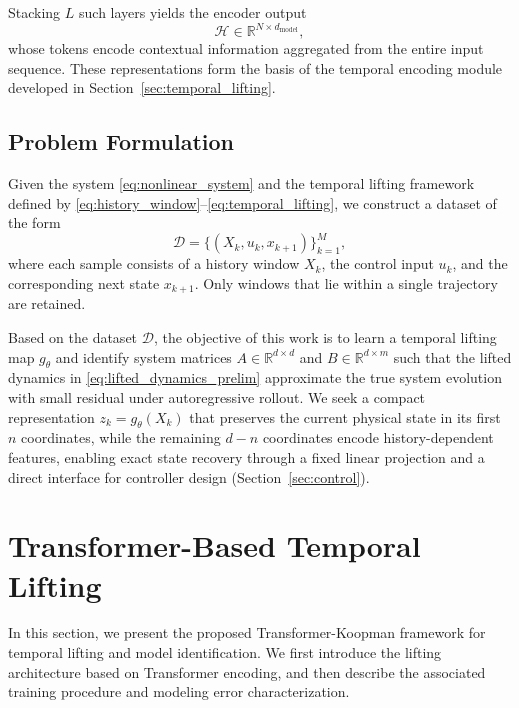 \documentclass[journal]{IEEEtran}
\begin{document}
Stacking $L$ such layers yields the encoder output
\begin{equation}
    \mathcal{H} \in \mathbb{R}^{N \times d_{\mathrm{model}}},
\end{equation}
whose tokens encode contextual information aggregated from the entire input sequence. These representations form the basis of the temporal encoding module developed in Section~\ref{sec:temporal_lifting}.

\subsection{Problem Formulation}
\label{sec:problem}

Given the system \eqref{eq:nonlinear_system} and the temporal lifting framework defined by \eqref{eq:history_window}--\eqref{eq:temporal_lifting}, we construct a dataset of the form
\begin{equation}
    \mathcal{D} = \{(X_k, u_k, x_{k+1})\}_{k=1}^{M},
    \label{eq:dataset}
\end{equation}
where each sample consists of a history window $X_k$, the control input $u_k$, and the corresponding next state $x_{k+1}$. Only windows that lie within a single trajectory are retained.

Based on the dataset $\mathcal{D}$, the objective of this work is to learn a temporal lifting map $g_\theta$ and identify system matrices $A \in \mathbb{R}^{d\times d}$ and $B \in \mathbb{R}^{d\times m}$ such that the lifted dynamics in \eqref{eq:lifted_dynamics_prelim} approximate the true system evolution with small residual under autoregressive rollout. We seek a compact representation $z_k = g_\theta(X_k)$ that preserves the current physical state in its first $n$ coordinates, while the remaining $d-n$ coordinates encode history-dependent features, enabling exact state recovery through a fixed linear projection and a direct interface for controller design (Section~\ref{sec:control}).

\section{Transformer-Based Temporal Lifting}
\label{sec:methodology}

In this section, we present the proposed Transformer-Koopman framework for temporal lifting and model identification. We first introduce the lifting architecture based on Transformer encoding, and then describe the associated training procedure and modeling error characterization.
\end{document}
